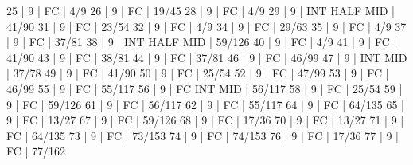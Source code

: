 25    |  9     |    FC                                        | 4/9   
26    |  9     |    FC                                        | 19/45   
28    |  9     |    FC                                        | 4/9   
29    |  9     |        INT  HALF            MID              | 41/90   
31    |  9     |    FC                                        | 23/54   
32    |  9     |    FC                                        | 4/9   
34    |  9     |    FC                                        | 29/63   
35    |  9     |    FC                                        | 4/9   
37    |  9     |    FC                                        | 37/81   
38    |  9     |        INT  HALF            MID              | 59/126   
40    |  9     |    FC                                        | 4/9   
41    |  9     |    FC                                        | 41/90   
43    |  9     |    FC                                        | 38/81   
44    |  9     |    FC                                        | 37/81   
46    |  9     |    FC                                        | 46/99   
47    |  9     |        INT                  MID              | 37/78   
49    |  9     |    FC                                        | 41/90   
50    |  9     |    FC                                        | 25/54   
52    |  9     |    FC                                        | 47/99   
53    |  9     |    FC                                        | 46/99   
55    |  9     |    FC                                        | 55/117   
56    |  9     |    FC  INT                  MID              | 56/117   
58    |  9     |    FC                                        | 25/54   
59    |  9     |    FC                                        | 59/126   
61    |  9     |    FC                                        | 56/117   
62    |  9     |    FC                                        | 55/117   
64    |  9     |    FC                                        | 64/135   
65    |  9     |    FC                                        | 13/27   
67    |  9     |    FC                                        | 59/126   
68    |  9     |    FC                                        | 17/36   
70    |  9     |    FC                                        | 13/27   
71    |  9     |    FC                                        | 64/135   
73    |  9     |    FC                                        | 73/153   
74    |  9     |    FC                                        | 74/153   
76    |  9     |    FC                                        | 17/36   
77    |  9     |    FC                                        | 77/162   
